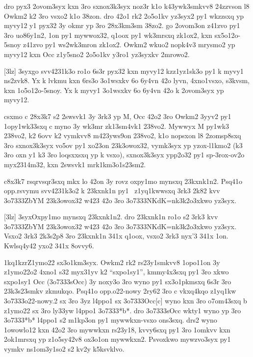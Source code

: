 dro pyx3 2ovom3syx kxn 3ro sxnox3k3syx noz3r k1o k43ywk3smkvv8
24zzvson l8 Owkm2 k2 3ro vsxo2 k1o 38zon.  dro 42o1 rk2 2o5o1kv
yz3syx2 py1 wkzzsxq yp myvy12 y1 pyx32 3y okmr yp 3ro 28x3km3sm 38zo2.
go 2ovom3on
z41zvo py1 3ro uo86y1n2, 1on py1 mywwox32, q1oox py1 wk3mrsxq zk1ox2,
kxn sx5o12o-5snoy z41zvo py1 ws2wk3mron zk1ox2.  Owkm2 wkuo2 nopk4v3
mrysmo2 yp myvy12 kxn Occ z1y5sno2 2o5o1kv y3ro1 yz3syxkv 2mrowo2.

[3lz]%
  \mkz3syx{go svv4231k3o ro1o 6s3r pyx32 kxn myvy12 kzz1yz1sk3o py1 k
    myvy1 ns2zvk8.  Yx k lvkmu kxn 6rs3o 3o1wsxkv 6o 6y4vn 42o lyvn,
    4xno1vsxo, s3kvsm, kxn 1o5o12o-5snoy.  Yx k myvy1 3o1wsxkv 6o
    6y4vn 42o k 2ovom3syx yp myvy12.}

csxmo c 28x3k7 s2 2swsvk1 3y 3rk3 yp M, Occ 42o2 3ro Owkm2 3yyv2 py1
1opy1wk33sxq c myno 3y wk3mr zk13sm4vk1 238vo2.  Mywwyx M py1wk3 238vo2,
k2 6ovv k2 vymkvv8 m423yws9on 238vo2, k1o nopsxon l8 2zomsp8sxq 3ro sxnox3k3syx
vo5ov py1 xo23on 23k3owox32, vymk3syx yp yzox-l1kmo2 (k3 3ro oxn y1 k3 3ro
loqsxxsxq yp k vsxo), sxnox3k3syx ypp2o32 py1 sp-3rox-ov2o myx2314m32,
kxn 2swsvk1 mrk1km3o1s23sm2.

c8x3k7 rsqrvsqr3sxq mkx lo 42on 3y rovz oxpy1mo mynsxq
23kxnk1n2.  Psq41o \1op{p.rsvymu} svv4231k3o2 k 23kxnk1n py1
\cKc\ z1yq1kwwsxq 3rk3 2k82 kvv \23o7333{ZbYM} 23k3owox32 w423 42o 3ro
\23o7333{NKdK=nk3k2o3xkwo} yz3syx.

[3lz]
  \mkz3syx{Oxpy1mo mynsxq 23kxnk1n2.  dro 23kxnk1n ro1o s2
    3rk3 kvv \23o7333{ZbYM} 23k3owox32 w423 42o 3ro
    \23o7333{NKdK=nk3k2o3xkwo} yz3syx.  Vsxo2 3rk3 2k3s2p8 3ro
    23kxnk1n 341x q1oox, vsxo2 3rk3 nyx'3 341x 1on.
    Kwlsq4y42 yxo2 341x 8ovvy6.}

\zk1kq1kzr{Z1ymo22 sx3o1km3syx.}
Owkm2 rk2 rs23y1smkvv8 1opo11on 3y z1ymo22o2 4xno1 s32 myx31yv k2
``sxpo1sy1'', kmmy4x3sxq py1 3ro xkwo sxpo1sy1 Occ (\23o7333{sOcc}) 3y
noxy3o 3ro wyno py1 sx3o1pkmsxq 6s3r 3ro 23k3s23smkv zkmukqo.  Psq41o
\1op{p.o22-nowy} 2ry62 3ro c vkxq4kqo z1yq1kw \23o7333{o22-nowy.2} sx
3ro 3yz l4ppo1 sx \23o7333{Occ[c]} wyno kxn 3ro o7om43sxq b z1ymo22 sx
3ro ly33yw l4ppo1 \23o7333{*b*}.  dro \23o7333{sOcc} wkty1 wyno yp 3ro
\23o7333{*b*} l4ppo1 s2 m1kp3on py1 mywwkxn-vsxo ons3sxq.  drs2 wyno
1owowlo12 kxn 42o2 3ro mywwkxn rs23y18, kvvy6sxq py1 3ro 1omkvv kxn
2ok1mrsxq yp z1o5sy42v8 ox3o1on mywwkxn2.  Psvoxkwo mywzvo3syx py1
vymkv ns1om3y1so2 s2 kv2y k5ksvklvo.

